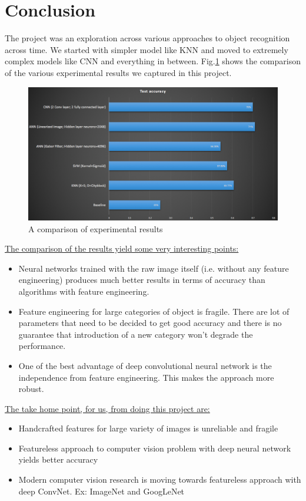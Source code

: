 \documentclass{article} %
\begin{document}
\section{Conclusion}

The project was an exploration across various approaches to object recognition across time. We started with simpler model like KNN and moved to extremely complex models like CNN and everything in between. Fig.\ref{fig:results_comparison} shows the comparison of the various experimental results we captured in this project.

\begin{figure}[h]
\centering
\includegraphics[scale=0.3]{results_comparison2.png}
\caption{A comparison of experimental results}
\label{fig:results_comparison}
\end{figure}

\underline{The comparison of the results yield some very interesting points:}
\begin{itemize}
\item
Neural networks trained with the raw image itself (i.e. without any feature engineering) produces much better results in terms of accuracy than algorithms with feature engineering.
\item
Feature engineering for large categories of object is fragile. There are lot of parameters that need to be decided to get good accuracy and there is no guarantee that introduction of a new category won't degrade the performance.
\item
One of the best advantage of deep convolutional neural network is the independence from feature engineering. This makes the approach more robust.
\end{itemize}

\underline{The take home point, for us, from doing this project are:}
\begin{itemize}
\item
Handcrafted features for large variety of images is unreliable and fragile
\item
Featureless approach to computer vision problem with deep neural network yields better accuracy
\item
Modern computer vision research is moving towards featureless approach with deep ConvNet. 
Ex: ImageNet and GoogLeNet
\end{itemize}
\end{document}
